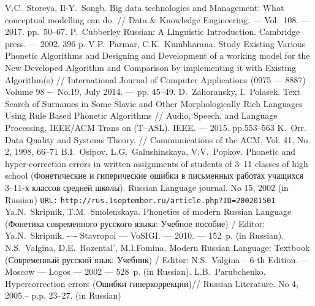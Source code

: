 \documentclass[conference,a4paper]{IEEEtran}
\providecommand\url[1]{\texttt{#1}}
\begin{document}
%
%
%
\begin{thebibliography}{11}

 V.C.~Storeya, Il-Y.~Songb. Big data technologies and Management: What conceptual modelling can do. // Data \& Knowledge Engineering. --- Vol.~108. --- 2017. pp.~50--67.
 P.~Cubberley Russian: A Linguistic Introduction. Cambridge press. --– 2002. 396 p.
	V.P.~Parmar, C.K.~Kumbharana. Study Existing Various Phonetic Algorithms and Designing and Development of a working model for the New Developed Algorithm and Comparison by implementing it with Existing Algorithm(s) // International Journal of Computer Applications (0975 –-- 8887) Volume 98 -– No.19, July 2014. --– pp. 45--49.
 D.~Zahoransky, I.~Polasek. Text Search of Surnames in Some Slavic and Other Morphologically Rich Languages Using Rule Based Phonetic Algorithms // Audio, Speech, and Language Processing, IEEE/ACM Trans on (T--ASL). IEEE. --– 2015. pp.553--563
 K.~Orr. Data Quality and Systems Theory. // Communications of the ACM, Vol. 41, No. 2, 1998, 66--71
	B.I.~Osipov, L.G.~Galushinskaya, V.V.~Popkov. Phonetic and hyper-correction errors in written assignments of students of 3--11 classes of high school (Фонетические и гиперические ошибки в письменных работах учащихся 3–11-х классов средней школы). Russian Language journal. No 15, 2002 (in Russian) \texttt{URL:} \url{http://rus.1september.ru/article.php?ID=200201501}
 Ya.N.~Skripnik, T.M.~Smolenskaya. Phonetics of modern Russian Language (Фонетика современного русского языка: Учебное пособие) / Editor: Ya.N.~Skripnik. -–- Stavropol --- VoSIGI. --- 2010. --– 152~p. (in Russian).
 N.S.~Valgina, D.E.~Rozental', M.I.Fomina. Modern Russian Language: Textbook (Современный русский язык: Учебник) / Editor: N.S.~Valgina -- 6-th Edition. --- Moscow --- Logos --- 2002 --– 528~p. (in Russian).
 L.B.~Parubchenko. Hypercorrection errors (Ошибки гиперкоррекции)// Russian Literature. No 4, 2005.-- p.p. 23--27. (in Russian)

\end{thebibliography}
\end{document}
